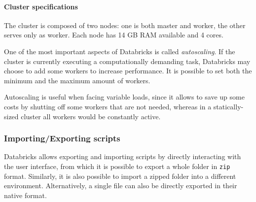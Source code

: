     \paragraph{Cluster specifications}
        The cluster is composed of two nodes: one is both master and worker, the other serves only as worker.
        Each node has 14 GB RAM available and 4 cores.
        
        One of the most important aspects of Databricks is called \textit{autoscaling}.
        If the cluster is currently executing a computationally demanding task, Databricks may choose to add some workers to increase performance.
        It is possible to set both the minimum and the maximum amount of workers.

        Autoscaling is useful when facing variable loads, since it allows to save up some costs by shutting off some workers that are not needed, whereas in a statically-sized cluster all workers would be constantly active.
        
\subsubsection{Importing/Exporting scripts}
    Databricks allows exporting and importing scripts by directly interacting with the user interface, from which it is possible to export a whole folder in \texttt{zip} format.
    Similarly, it is also possible to import a zipped folder into a different environment.
    Alternatively, a single file can also be directly exported in their native format.
